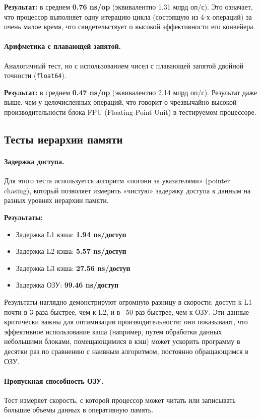 \textbf{Результат:} в среднем \textbf{0.76 ns/op} (эквивалентно 1.31 млрд оп/с). Это означает, что процессор выполняет одну итерацию цикла (состоящую из 4-х операций) за очень малое время, что свидетельствует о высокой эффективности его конвейера.

\paragraph{Арифметика с плавающей запятой.} Аналогичный тест, но с использованием чисел с плавающей запятой двойной точности (\texttt{float64}).

\textbf{Результат:} в среднем \textbf{0.47 ns/op} (эквивалентно 2.14 млрд оп/с). Результат даже выше, чем у целочисленных операций, что говорит о чрезвычайно высокой производительности блока FPU (Floating-Point Unit) в тестируемом процессоре.

\subsection{Тесты иерархии памяти}

\paragraph{Задержка доступа.} Для этого теста используется алгоритм «погони за указателями» (pointer chasing), который позволяет измерить «чистую» задержку доступа к данным на разных уровнях иерархии памяти.

\textbf{Результаты:}
\begin{itemize}
    \item Задержка L1 кэша: \textbf{1.94 ns/доступ}
    \item Задержка L2 кэша: \textbf{5.57 ns/доступ}
    \item Задержка L3 кэша: \textbf{27.56 ns/доступ}
    \item Задержка ОЗУ: \textbf{99.46 ns/доступ}
\end{itemize}
Результаты наглядно демонстрируют огромную разницу в скорости: доступ к L1 почти в 3 раза быстрее, чем к L2, и в ~50 раз быстрее, чем к ОЗУ. Эти данные критически важны для оптимизации производительности: они показывают, что эффективное использование кэша (например, путем обработки данных небольшими блоками, помещающимися в кэш) может ускорить программу в десятки раз по сравнению с наивным алгоритмом, постоянно обращающимся в ОЗУ.

\paragraph{Пропускная способность ОЗУ.} Тест измеряет скорость, с которой процессор может читать или записывать большие объемы данных в оперативную память.

